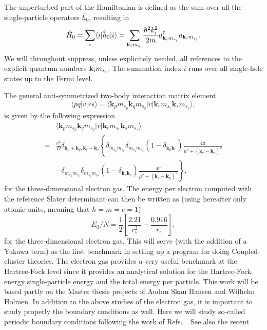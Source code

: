 \documentclass[aps,prc,twocolumn,showpacs,floatfix,nofootinbib,preprintnumbers,superscriptaddress,amsmath,amssymb]{revtex4-1}
\begin{document}
The unperturbed part
of the Hamiltonian is defined as the sum over all the single-particle
operators $\hat{h}_0$, resulting in
\[
\hat{H}_{0}=\sum_i\langle i|\hat{h}_0|i \rangle= {\displaystyle\sum_{{\bf k}_{i}m_{s_i}}}
\frac{\hbar^{2}k_i^{2}}{2m}a_{{\bf k}_{i}m_{s_i}}^{\dagger}
a_{{\bf k}_{i}m_{s_i}}.
\]
We will throughout suppress, unless explicitely needed, all references
to the explicit quantum numbers ${\bf k}_{i}m_{s_i}$. The summation
index $i$ runs over all single-hole states up to the Fermi level.

The general anti-symmetrized two-body interaction matrix element 
\[
\langle pq |v| r s \rangle = \langle
\mathbf{k}_{p}m_{s_{p}}\mathbf{k}_{q}m_{s_{q}}|v|\mathbf{k}_{r}m_{s_{r}}\mathbf{k}_{s}m_{s_{s}}\rangle,
\]
is given by the following expression
  \begin{align}
    & \langle
    \mathbf{k}_{p}m_{s_{p}}\mathbf{k}_{q}m_{s_{q}}|v|\mathbf{k}_{r}m_{s_{r}}\mathbf{k}_{s}m_{s_{s}}\rangle
    \nonumber \\ =&
    \frac{e^{2}}{\Omega}\delta_{\mathbf{k}_{p}+\mathbf{k}_{q},
      \mathbf{k}_{r}+\mathbf{k}_{s}}\left\{
    \delta_{m_{s_{p}}m_{s_{r}}}\delta_{m_{s_{q}}m_{s_{s}}}(1-\delta_{\mathbf{k}_{p}\mathbf{k}_{r}})\frac{4\pi
    }{\mu^{2} + (\mathbf{k}_{r}-\mathbf{k}_{p})^{2}} \right. \nonumber
    \\ & \left. -
    \delta_{m_{s_{p}}m_{s_{s}}}\delta_{m_{s_{q}}m_{s_{r}}}(1-\delta_{\mathbf{k}_{p}\mathbf{k}_{s}})\frac{4\pi
    }{\mu^{2} + (\mathbf{k}_{s}-\mathbf{k}_{p})^{2}} \right\},
    \nonumber
  \end{align}
for the three-dimensional electron gas.  The energy per electron computed with
the reference Slater determinant can then be written as 
(using hereafter only atomic units, meaning that $\hbar = m = e = 1$)
\[
E_0/N=\frac{1}{2}\left[\frac{2.21}{r_s^2}-\frac{0.916}{r_s}\right],
\]
for the three-dimensional electron gas.  This will serve (with the
addition of a Yukawa term) as the first benchmark in setting up a
program for doing Coupled-cluster theories. 
The electron gas provides a very useful benchmark at the Hartree-Fock level since it provides
an analytical solution for the Hartree-Fock energy single-particle energy and the total  energy per particle. 
This work will be based partly on the 
Master thesis projects of Audun Skau Hansen and Wilhelm Holmen.  
In addition to the above studies of the electron gas, it
is important to study properly the boundary conditions as well. Here
we will study so-called periodic boundary conditions following the
work of Refs.~\cite{gros1992,gros1996,lin2001}. See also the recent
\end{document}
